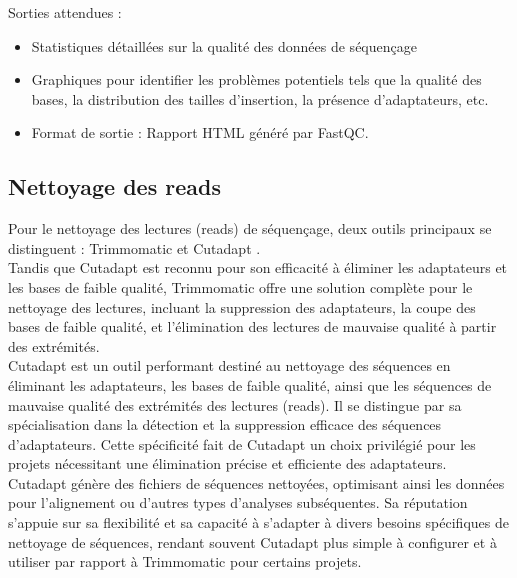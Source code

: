 \documentclass{report}
\begin{document}
\noindent Sorties attendues :
\begin{itemize}
    \item Statistiques détaillées sur la qualité des données de séquençage
    \item Graphiques pour identifier les problèmes potentiels tels que la qualité des bases, la distribution des tailles d'insertion, la présence d'adaptateurs, etc.
    \item Format de sortie : Rapport HTML généré par FastQC.
\end{itemize}


\subsection{Nettoyage des reads}
Pour le nettoyage des lectures (reads) de séquençage, deux outils principaux se distinguent :  Trimmomatic \cite{trimmomatic} et  Cutadapt \cite{martin2011cutadapt}.\\

Tandis que Cutadapt est reconnu pour son efficacité à éliminer les adaptateurs et les bases de faible qualité, Trimmomatic offre une solution complète pour le nettoyage des lectures, incluant la suppression des adaptateurs, la coupe des bases de faible qualité, et l'élimination des lectures de mauvaise qualité à partir des extrémités. \\

Cutadapt est un outil performant destiné au nettoyage des séquences en éliminant les adaptateurs, les bases de faible qualité, ainsi que les séquences de mauvaise qualité des extrémités des lectures (reads). Il se distingue par sa spécialisation dans la détection et la suppression efficace des séquences d'adaptateurs. Cette spécificité fait de Cutadapt un choix privilégié pour les projets nécessitant une élimination précise et efficiente des adaptateurs.\\

Cutadapt génère des fichiers de séquences nettoyées, optimisant ainsi les données pour l'alignement ou d'autres types d'analyses subséquentes. Sa réputation s'appuie sur sa flexibilité et sa capacité à s'adapter à divers besoins spécifiques de nettoyage de séquences, rendant souvent Cutadapt plus simple à configurer et à utiliser par rapport à Trimmomatic pour certains projets.\\
\end{document}
